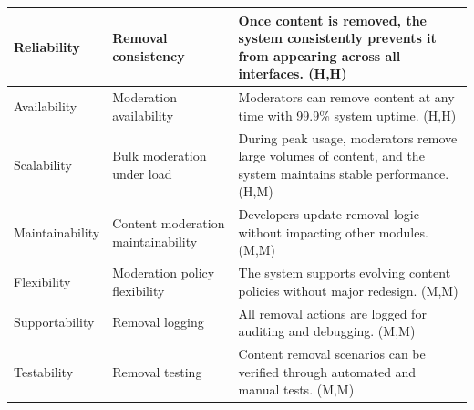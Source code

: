 \documentclass{article}
\begin{document}
\begin{table}[H]
\begin{tabular}{|p{3cm}|p{4cm}|p{7cm}|}
        Reliability
                                   & Removal consistency
                                   & Once content is removed, the system consistently prevents it from appearing across all interfaces. (H,H)                                          \\
        \hline

        Availability
                                   & Moderation availability
                                   & Moderators can remove content at any time with 99.9\% system uptime. (H,H)                                                                        \\
        \hline

        Scalability
                                   & Bulk moderation under load
                                   & During peak usage, moderators remove large volumes of content, and the system maintains stable performance. (H,M)                                 \\
        \hline

        Maintainability
                                   & Content moderation maintainability
                                   & Developers update removal logic without impacting other modules. (M,M)                                                                            \\
        \hline

        Flexibility
                                   & Moderation policy flexibility
                                   & The system supports evolving content policies without major redesign. (M,M)                                                                       \\
        \hline

        Supportability
                                   & Removal logging
                                   & All removal actions are logged for auditing and debugging. (M,M)                                                                                  \\
        \hline

        Testability
                                   & Removal testing
                                   & Content removal scenarios can be verified through automated and manual tests. (M,M)                                                               \\
        \hline
    \end{tabular}
\end{table}
\end{document}
